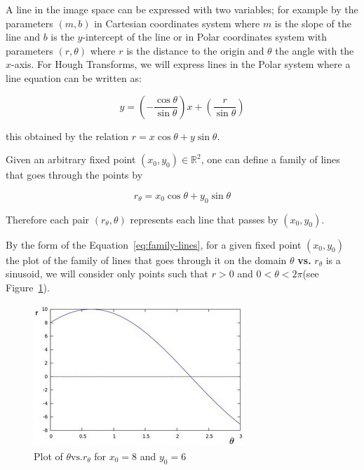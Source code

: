 \bigskip

A line in the image space can be expressed with two variables; for example by the parameters $(m,b)$ in Cartesian coordinates system where $m$ is the slope of the line and $b$ is the $y$-intercept of the line or in Polar coordinates system with parameters $(r,\theta)$ where $r$ is the distance to the origin and $\theta$ the angle with the $x$-axis. For Hough Transforms, we will express lines in the Polar system where a line equation can be written as:

\begin{equation}
\label{eq:polar-lines}
y = \left(-\frac{\cos\theta}{\sin\theta}\right)x+\left(\frac{r}{\sin\theta}\right)
\end{equation} 

this obtained by the relation $r=x\cos\theta+y\sin\theta$.

\bigskip

Given an arbitrary fixed point $(x_0,y_0)\in\mathbb{R}^2$, one can define a family of lines that goes through the points by

\begin{equation}
\label{eq:family-lines}
r_{\theta}=x_0\cos\theta+y_0\sin\theta
\end{equation}

Therefore each pair $(r_{\theta},\theta)$ represents each line that passes by $(x_0,y_0)$.

\bigskip 

By the form of the Equation~\ref{eq:family-lines}, for a given fixed point $(x_0,y_0)$ the plot of the family of lines that goes through it on the domain $\theta$ \textbf{vs.} $r_{\theta}$ is a sinusoid, we will consider only points such that $r>0$ and $0<\theta<2\pi$(see Figure~\ref{fig:family-lines-hough}).

\begin{figure}[h!]
\centering
\includegraphics[width = 0.8 \textwidth]{./Diagrams/family-lines-hough.jpg}
\caption{Plot of $\theta\textrm{vs.}r_{\theta}$ for $x_0=8$ and $y_0=6$}
\label{fig:family-lines-hough}
\end{figure}

